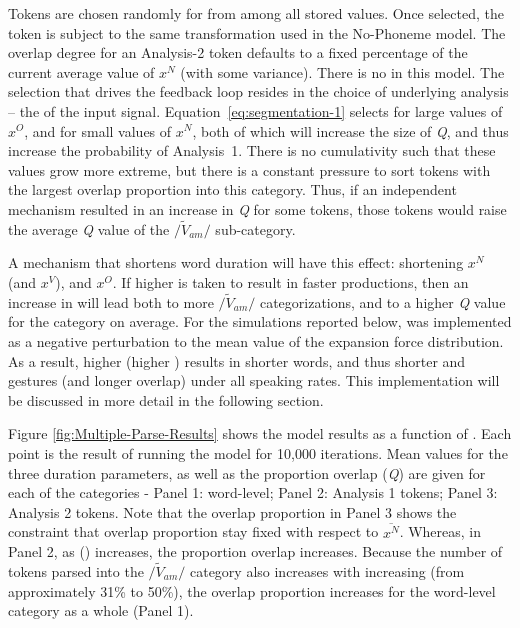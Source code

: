 Tokens are chosen randomly for  from among all stored values.
Once selected, the token is subject to the same  transformation
used in the No-Phoneme model. The overlap degree for an Analysis-2
token defaults to a fixed percentage of the current average value
of $x^{N}$ (with some variance). There is no   in this
model. The selection  that drives the feedback loop resides in
the choice of underlying analysis – the  of the input signal.
Equation~\ref{eq:segmentation-1} selects for large values of $x^{O}$,
and for small values of $x^{N}$, both of which will increase the
size of \emph{Q}, and thus increase the probability of Analysis~1.
There is no cumulativity such that these values grow more extreme,
but there is a constant pressure to sort tokens with the largest overlap
proportion into this  category. Thus, if an independent
mechanism resulted in an increase in \emph{Q} for some tokens, those
tokens would raise the average \emph{Q} value of the $/\tilde{V}_{am}/$
sub-category.

A mechanism that shortens word duration will have this effect: shortening
$x^{N}$ (and $x^{V}$), and  $x^{O}$. If higher 
is taken to result in faster productions, then an increase in 
will lead both to more $/\tilde{V}_{am}/$ categorizations, and to a higher \emph{Q} value for the category on average. For the simulations
reported below,  was implemented as a negative perturbation
to the mean value of the expansion force distribution. As a result,
higher  (higher ) results in shorter words,
and thus shorter  and  gestures (and longer overlap)
under all speaking rates. This implementation will be discussed in
more detail in the following section. 

Figure \ref{fig:Multiple-Parse-Results} shows the model results as
a function of . Each point is the result of running the model
for 10,000 iterations. Mean values for the three duration parameters,
as well as the proportion overlap (\emph{Q}) are given for each of
the categories - Panel 1: word-level; Panel 2: Analysis 1 tokens; Panel
3: Analysis 2 tokens. Note that the overlap proportion in Panel 3
shows the constraint that overlap proportion stay fixed with respect
to $\overline{x^{N}}$. Whereas, in Panel 2, as 
() increases, the proportion overlap increases. Because the
number of tokens parsed into the $/\tilde{V}_{am}/$ category also
increases with increasing  (from approximately 31\%
to 50\%), the overlap proportion increases for the word-level category
as a whole (Panel 1). 

